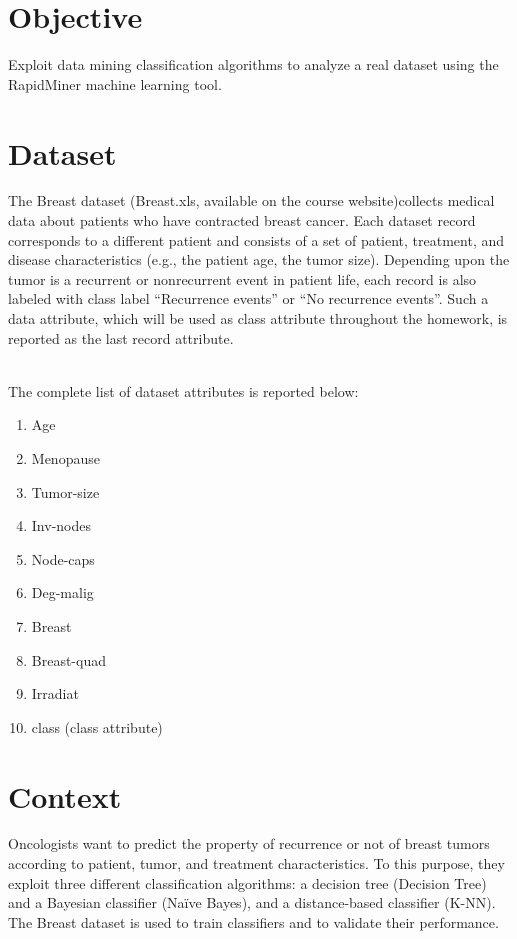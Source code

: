 \section{Objective}

Exploit data mining classification algorithms to analyze a real dataset using the RapidMiner machine
learning tool.

\section{Dataset}

The Breast dataset (Breast.xls, available on the course website)collects medical data about patients who
have contracted breast cancer. Each dataset record corresponds to a different patient and consists of a set
of patient, treatment, and disease characteristics (e.g., the patient age, the tumor size). Depending upon
the tumor is a recurrent or nonrecurrent event in patient life, each record is also labeled with class label
“Recurrence events” or “No recurrence events”. Such a data attribute, which will be used as class attribute
throughout the homework, is reported as the last record attribute.

\\
The complete list of dataset attributes is reported below:
\begin{enumerate}
    \item Age
    \item Menopause
    \item Tumor-size
    \item Inv-nodes
    \item Node-caps
    \item Deg-malig
    \item Breast
    \item Breast-quad
    \item Irradiat
    \item class (class attribute)
\end{enumerate}

\section{Context}

Oncologists want to predict the property of recurrence or not of breast tumors according to patient, tumor,
and treatment characteristics. To this purpose, they exploit three different classification algorithms: a
decision tree (Decision Tree) and a Bayesian classifier (Naïve Bayes), and a distance-based classifier (K-NN).
The Breast dataset is used to train classifiers and to validate their performance.